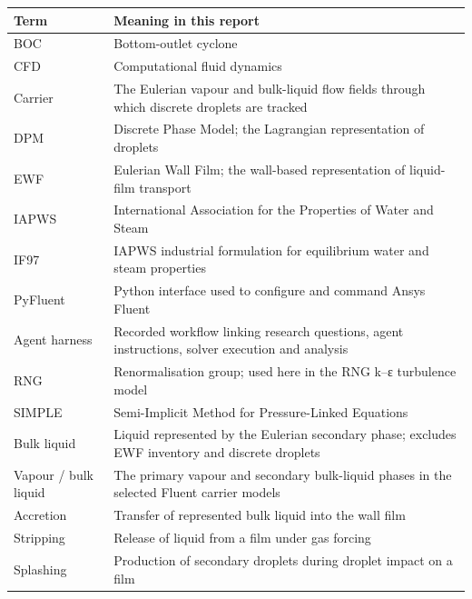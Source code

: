 \documentclass[12pt]{article}
\newcounter{none}
\begin{document}
\begingroup\small\setlength{\tabcolsep}{3pt}
{\def\LTcaptype{none} %
\begin{longtable}[]{@{}
  >{\raggedright\arraybackslash}p{}
  >{\raggedright\arraybackslash}p{}@{}}
\toprule\noalign{}
\begin{minipage}[b]{\linewidth}\raggedright
Term
\end{minipage} & \begin{minipage}[b]{\linewidth}\raggedright
Meaning in this report
\end{minipage} \\
\midrule\noalign{}
\endhead
\bottomrule\noalign{}
\endlastfoot
BOC & Bottom-outlet cyclone \\
CFD & Computational fluid dynamics \\
Carrier & The Eulerian vapour and bulk-liquid flow fields through which discrete droplets are tracked \\
DPM & Discrete Phase Model; the Lagrangian representation of droplets \\
EWF & Eulerian Wall Film; the wall-based representation of liquid-film transport \\
IAPWS & International Association for the Properties of Water and Steam \\
IF97 & IAPWS industrial formulation for equilibrium water and steam properties \\
PyFluent & Python interface used to configure and command Ansys Fluent \\
Agent harness & Recorded workflow linking research questions, agent instructions, solver execution and analysis \\
RNG & Renormalisation group; used here in the RNG k--ε turbulence model \\
SIMPLE & Semi-Implicit Method for Pressure-Linked Equations \\
Bulk liquid & Liquid represented by the Eulerian secondary phase; excludes EWF inventory and discrete droplets \\
Vapour / bulk liquid & The primary vapour and secondary bulk-liquid phases in the selected Fluent carrier models \\
Accretion & Transfer of represented bulk liquid into the wall film \\
Stripping & Release of liquid from a film under gas forcing \\
Splashing & Production of secondary droplets during droplet impact on a film \\

\end{longtable}}
\end{document}
